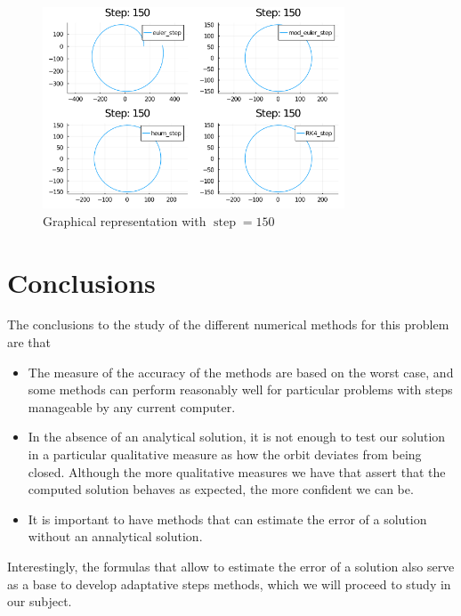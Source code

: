 \documentclass[12pt, onside]{article}
\begin{document}
\begin{figure}[p]
    \centering
    \includegraphics[width=0.8\textwidth]{media/two_bodies_step_150.png}
    \caption{Graphical representation with $\operatorname{step} = 150$}
    \label{fig:step150}
\end{figure}

\section{Conclusions}

    The conclusions to the study of the different numerical methods for this problem are that

\begin{itemize}
    \item The measure of the accuracy of the methods are based on the worst case,
    and some methods can perform reasonably well for particular problems
    with steps manageable by any current computer.

    \item In the absence of an analytical solution,
    it is not enough to test our solution in a particular qualitative measure as
    how the orbit deviates from being closed.
    Although the more qualitative measures we have that assert that
    the computed solution behaves as expected,
    the more confident we can be.

    \item It is important to have methods that can estimate the error of a solution
    without an annalytical solution.
\end{itemize}

Interestingly, the formulas that allow to estimate the error of a solution
also serve as a base to develop adaptative steps methods,
which we will proceed to study in our subject.
\end{document}
